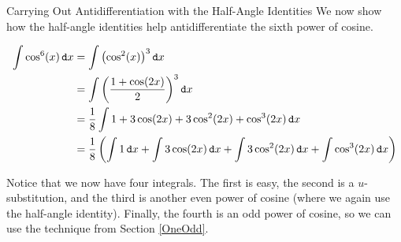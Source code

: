 \begin{example}{Carrying Out Antidifferentiation with the Half-Angle Identities}
We now show how the half-angle identities help antidifferentiate the sixth power of cosine. 

\begin{align*} \int  \cos^6(x) \dif x &=\int \left(\cos^2(x)\right)^3  \dif x \\
&=\int \left(\frac{1+\cos(2x)}{2}\right)^3  \dif x \\ 
&=\frac{1}{8}\int 1+3\cos(2x)+3\cos^2(2x)+\cos^3(2x)  \dif x \\
&=\frac{1}{8}\left(\int 1\dif x+\int 3\cos(2x)\dif x+\int 3\cos^2(2x)\dif x+\int \cos^3(2x) \dif x\right)
\end{align*}

Notice that we now have four integrals.  The first is easy, the second is a $u$-substitution, and the third is another even power of cosine (where we again use the half-angle identity).  Finally, the fourth is an odd power of cosine, so we can use the technique from Section \ref{OneOdd}.  

\end{example}

